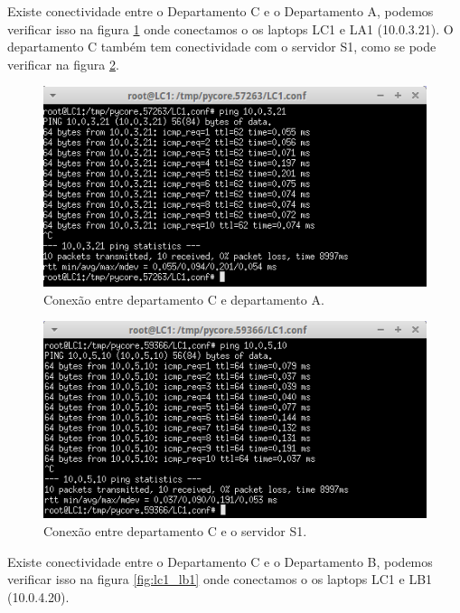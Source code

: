 \documentclass{llncs}
\begin{document}
Existe conectividade entre o Departamento C e o Departamento A, podemos verificar isso na figura \ref{fig:lc1_la1} onde conectamos o os laptops LC1 e LA1 (10.0.3.21). O departamento C também tem conectividade com o servidor S1, como se pode verificar na figura \ref{fig:lc1_s1}.

\begin{figure}[H]
\begin{center}
\includegraphics[scale=0.50]{LC1_LA1.png} 
\end{center}
\caption{\label{fig:lc1_la1} Conexão entre departamento C e departamento A.}
\end{figure} 

\begin{figure}[H]
\begin{center}
\includegraphics[scale=0.50]{LC1_S1.png} 
\end{center}
\caption{\label{fig:lc1_s1} Conexão entre departamento C e o servidor S1.}
\end{figure} 


Existe conectividade entre o Departamento C e o Departamento B, podemos verificar isso na figura \ref{fig:lc1_lb1} onde conectamos o os laptops LC1 e LB1 (10.0.4.20).
\end{document}
